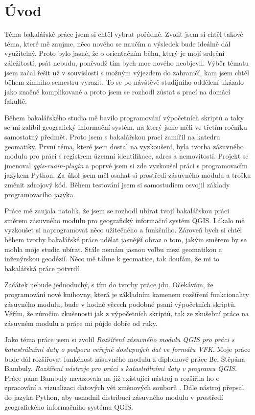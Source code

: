 \chapter{Úvod}
\label{1-uvod}
Téma bakalářské práce jsem si chtěl vybrat pořádně. Zvolit jsem si chtěl takové téma, které mě zaujme, něco nového se naučím a výsledek bude ideálně dál využitelný. Proto bylo jasné, že o orientačním běhu, který je mojí srdeční záležitostí, psát nebudu, poněvadž tím bych moc nového neobjevil. Výběr tématu jsem začal řešit už v souvislosti s možným výjezdem do zahraničí, kam jsem chtěl během zimního semestru vyrazit. To se po návštěvě studijního oddělení ukázalo jako značně komplikované a proto jsem se rozhodl zůstat s prací na domácí fakultě.

Během bakalářského studia mě bavilo programování výpočetních skriptů a taky se mi zalíbil geografický informační systém, na který jsme měli ve třetím ročníku samostatný předmět. Proto jsem s bakalářskou prací zamířil na katedru geomatiky. První téma, které jsem dostal na vyzkoušení, byla tvorba zásuvného modulu pro práci s registrem územní identifikace, adres a nemovitostí. Projekt se jmenoval \textit{qgis-ruain-plugin} a poprvé jsem si zde vyzkoušel práci s programovacím jazykem Python. Za úkol jsem měl osahat si prostředí zásuvného modulu a trošku změnit zdrojový kód. Během testování jsem si samostudiem osvojil základy programovacího jazyka.

Práce mě zaujala natolik, že jsem se rozhodl ubírat tvojí bakalářskou práci směrem zásuvného modulu pro geografický informační systém QGIS. Lákalo mě vyzkoušet si naprogramovat něco užitečného a funkčního. Zároveň bych si chtěl během tvorby bakalářské práce udělat jasnější obraz o tom, jakým směrem by se mohla moje studia ubírat. Stále nemám jasnou volbu mezi geomatikou a inženýrskou geodézií. Něco mě táhne k geomatice, tak doufám, že mi to bakalářská práce potvrdí.

Začátek nebude jednoduchý, s tím do tvorby práce jdu. Očekávám, že programování nové knihovny, která je základním kamenem rozšíření funkcionality zásuvného modulu, bude v hodně věcech podobné psaní výpočetních skriptů.  Věřím, že zúročím zkušenosti jak z výpočetních skriptů, tak ze zkušební práce na zásuvném modulu a práce mi půjde dobře od ruky.

Jako téma práce jsem si zvolil \textit{Rozšíření zásuvného modulu QGIS pro práci s katastrálními daty o podporu veřejně dostupných dat ve formátu VFK}.  Moje práce bude dál rozšiřovat funkčnost zásuvného modulu z diplomové práce Bc. Štěpána Bambuly. \textit{Rozšíření nástroje pro práci s katastrálními daty v programu QGIS}. Práce pana Bambuly navazovala na již existující nástroj a rozšířila ho o zpracování a vizualizaci datových vět změnových souborů . Dále nástroj přepsal do jazyka Python, aby usnadnil distribuci zásuvného modulu v prostředí geografického informačního systému QGIS.

